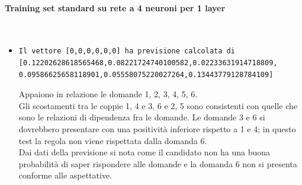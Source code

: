 \paragraph{Training set standard su rete a 4 neuroni per 1 layer}\mbox{}
\label{Training set standard su rete a 4 neuroni per 1 layer}
\\
\noindent
\begin{itemize}
\item \begin{verbatim}Il vettore [0,0,0,0,0,0] ha previsione calcolata di
[0.12202628618565468,0.08221724740100582,0.02233631914718809,
0.09586625658118901,0.05558075220027264,0.13443779128784109]
\end{verbatim}
Appaiono in relazione le domande 1, 2, 3, 4, 5, 6.\\
Gli scostamenti tra le coppie 1, 4 e 3, 6  e 2, 5 sono consistenti con quelle che sono le relazioni di dipendenza fra le domande.
Le domande 3 e 6 si dovrebbero presentare con una positivit\`a inferiore rispetto a 1 e 4; in questo test la regola non viene rispettata dalla domanda 6.\\
Dai dati della previsione si nota come il candidato non ha una buona probabilit\`a di saper rispondere alle domande  e la domanda 6 non si presenta conforme alle aspettative.
\end{itemize}

